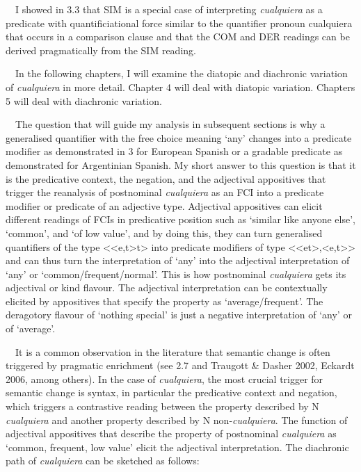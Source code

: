 \documentclass[10pt]{article}
\newenvironment{styleStandard}{\renewcommand\baselinestretch{1.25}\setlength\leftskip{0cm}\setlength\rightskip{0cm}\setlength\parindent{0cm}\setlength\parfillskip{0pt plus 1fil}\setlength\parskip{0in plus 1pt}\writerlistparindent\writerlistleftskip\leavevmode\normalfont\normalsize\fontsize{12pt}{14.4pt}\selectfont\writerlistlabel\ignorespaces}{\unskip\vspace{0in plus 1pt}\par}
\newcommand\writerlistleftskip{}
\newcommand\writerlistparindent{}
\newcommand\writerlistlabel{}
\begin{document}
\begin{styleStandard}
\ \ I showed in 3.3 that SIM is a special case of interpreting \textit{cualquiera} as a predicate with quantificiational force similar to the quantifier pronoun cualquiera that occurs in a comparison clause and that the COM and DER readings can be derived pragmatically from the SIM reading. 
\end{styleStandard}

\begin{styleStandard}
\ \ In the following chapters, I will examine the diatopic and diachronic variation of \textit{cualquiera} in more detail. Chapter 4 will deal with diatopic variation. Chapters 5 will deal with diachronic variation. 
\end{styleStandard}

\begin{styleStandard}
\ \ The question that will guide my analysis in subsequent sections is why a generalised quantifier with the free choice meaning ‘any’ changes into a predicate modifier as demonstrated in 3 for European Spanish or a gradable predicate as demonstrated for Argentinian Spanish. My short answer to this question is that it is the predicative context, the negation, and the adjectival appositives that trigger the reanalysis of postnominal \textit{cualquiera} as an FCI into a predicate modifier or predicate of an adjective type. Adjectival appositives can elicit different readings of FCIs in predicative position such as ‘similar like anyone else’, ‘common’, and ‘of low value’, and by doing this, they can turn generalised quantifiers of the type {\textless}{\textless}e,t{\textgreater}t{\textgreater} into predicate modifiers of type {\textless}{\textless}et{\textgreater},{\textless}e,t{\textgreater}{\textgreater} and can thus turn the interpretation of ‘any’ into the adjectival interpretation of ‘any’ or ‘common/frequent/normal’. This is how postnominal \textit{cualquiera} gets its adjectival or kind flavour. The adjectival interpretation can be contextually elicited by appositives that specify the property as ‘average/frequent’. The deragotory flavour of ‘nothing special’ is just a negative interpretation of ‘any’ or of ‘average’.
\end{styleStandard}

\begin{styleStandard}
\ \ It is a common observation in the literature that semantic change is often triggered by pragmatic enrichment (see 2.7 and Traugott \& Dasher 2002, Eckardt 2006, among others). In the case of \textit{cualquiera}, the most crucial trigger for semantic change is syntax, in particular the predicative context and negation, which triggers a contrastive reading between the property described by N\textit{ cualquiera} and another property described by N non-\textit{cualquiera}. The function of adjectival appositives that describe the property of postnominal \textit{cualquiera }as ‘common, frequent, low value’\textit{ }elicit the adjectival interpretation. The diachronic path of \textit{cualquiera} can be sketched as follows:
\end{styleStandard}
\end{document}
